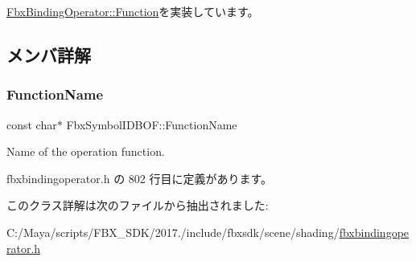 \hyperlink{class_fbx_binding_operator_1_1_function_a9bbeec993a6e453a6569e7f40a85fd52}{Fbx\+Binding\+Operator\+::\+Function}を実装しています。



\subsection{メンバ詳解}
\mbox{\label{class_fbx_symbol_i_d_b_o_f_a7f5ac03e2e8bb5358dff19973afee349}} 
\subsubsection{\texorpdfstring{Function\+Name}{FunctionName}}
{\footnotesize\ttfamily const char$\ast$ Fbx\+Symbol\+I\+D\+B\+O\+F\+::\+Function\+Name\hspace{0.3cm}{\ttfamily [static]}}



Name of the operation function. 



 fbxbindingoperator.\+h の 802 行目に定義があります。



このクラス詳解は次のファイルから抽出されました\+:\begin{DoxyCompactItemize}
\item 
C\+:/\+Maya/scripts/\+F\+B\+X\+\_\+\+S\+D\+K/2017./include/fbxsdk/scene/shading/\hyperlink{fbxbindingoperator_8h}{fbxbindingoperator.\+h}\end{DoxyCompactItemize}
